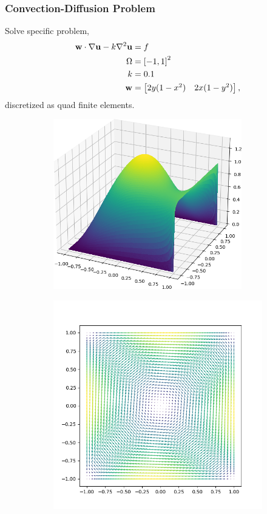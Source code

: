 \documentclass[handout]{beamer}
\renewcommand{\vec}[1]{ {\bf #1} }
\begin{document}
\begin{frame}
  \frametitle{Convection-Diffusion Problem}
  Solve specific problem,
  \begin{align*}
    \vec{w}\cdot\nabla \vec{u} -k\nabla^2\vec{u} &= f \\
    \Omega &= \left[-1,1\right]^2 \\
    k &= 0.1 \\
    \vec{w} &= \begin{bmatrix} 2y(1-x^2) & 2x(1-y^2)  \end{bmatrix},
  \end{align*}
  discretized as quad finite elements.
  \begin{figure}[h]
    \begin{subfigure}{.48\textwidth}
      \includegraphics[width=0.9\textwidth]{figures/recirculating.png}
    \end{subfigure}
    \begin{subfigure}{.48\textwidth}
      \includegraphics[width=\textwidth]{figures/wind.png}

\end{subfigure}
\end{figure}
\end{frame}
\end{document}
